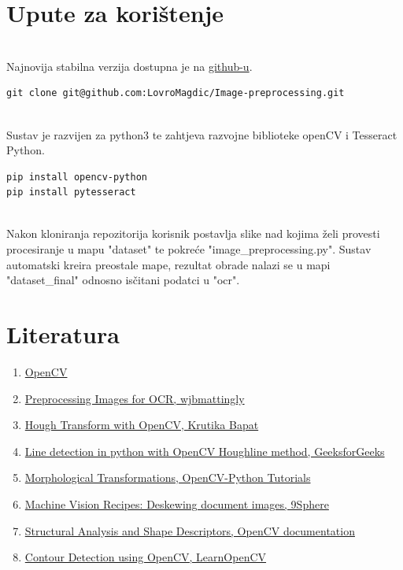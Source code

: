 \documentclass{article}
\begin{document}
\section{Upute za korištenje}
\\
Najnovija stabilna verzija dostupna je na \href{https://github.com/LovroMagdic/Image-preprocessing}{github-u}.
\begin{lstlisting}
git clone git@github.com:LovroMagdic/Image-preprocessing.git
\end{lstlisting}
\\
Sustav je razvijen za python3 te zahtjeva razvojne biblioteke openCV i Tesseract Python.
\begin{lstlisting}
pip install opencv-python
pip install pytesseract
\end{lstlisting}
\\
Nakon kloniranja repozitorija korisnik postavlja slike nad kojima želi provesti procesiranje u mapu "dataset" te pokreće "image\_preprocessing.py". Sustav automatski kreira preostale mape, rezultat obrade nalazi se u mapi "dataset\_final" odnosno isčitani podatci u "ocr". 
\newpage
\section{Literatura}
\begin{enumerate}
    \item \href{https://docs.opencv.org/4.x}{OpenCV}
    \item \href{https://github.com/wjbmattingly/ocr_python_textbook/blob/main/02_02_working%20with%20opencv.ipynb}{Preprocessing Images for OCR, wjbmattingly}
    \item \href{ https://learnopencv.com/hough-transform-with-opencv-c-python/}{Hough Transform with OpenCV, Krutika Bapat}
    \item \href{https://www.geeksforgeeks.org/line-detection-python-opencv-houghline-method/}{Line detection in python with OpenCV Houghline method, GeeksforGeeks}
    \item \href{https://opencv24-python-tutorials.readthedocs.io/en/latest/py_tutorials/py_imgproc/py_morphological_ops/py_morphological_ops.html}{Morphological Transformations, OpenCV-Python Tutorials}
    \item \href{https://medium.com/@9sphere/machine-vision-recipes-deskewing-document-images-e17827894c34}{Machine Vision Recipes: Deskewing document images, 9Sphere}
    \item \href{https://docs.opencv.org/2.4/modules/imgproc/doc/structural_analysis_and_shape_descriptors.html#findcontours}{Structural Analysis and Shape Descriptors, OpenCV documentation}
    \item \href{https://learnopencv.com/contour-detection-using-opencv-python-c/#Drawing-Contours-using-CHAIN_APPROX_SIMPLE}{Contour Detection using OpenCV, LearnOpenCV}
    
\end{enumerate}
\end{document}
